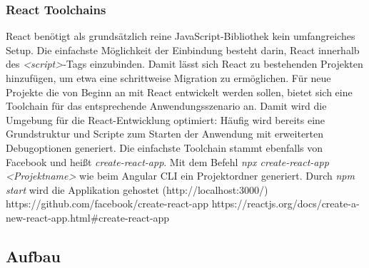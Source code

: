 \subsubsection{React Toolchains}
React benötigt als grundsätzlich reine JavaScript-Bibliothek kein umfangreiches Setup. Die einfachste Möglichkeit der Einbindung besteht darin, React innerhalb des \textit{<script>}-Tags einzubinden. Damit lässt sich React zu bestehenden Projekten hinzufügen, um etwa eine schrittweise Migration zu ermöglichen. Für neue Projekte die von Beginn an mit React entwickelt werden sollen, bietet sich eine Toolchain für das entsprechende Anwendungsszenario an. Damit wird die Umgebung für die React-Entwicklung optimiert: Häufig wird bereits eine Grundstruktur und Scripte zum Starten der Anwendung mit erweiterten Debugoptionen generiert. Die einfachste Toolchain stammt ebenfalls von Facebook und heißt \textit{create-react-app}. Mit dem Befehl \textit{npx create-react-app <Projektname>} wie beim Angular CLI ein Projektordner generiert. Durch \textit{npm start} wird die Applikation gehostet (http://localhost:3000/)
https://github.com/facebook/create-react-app
https://reactjs.org/docs/create-a-new-react-app.html\#create-react-app

\subsection{Aufbau}
